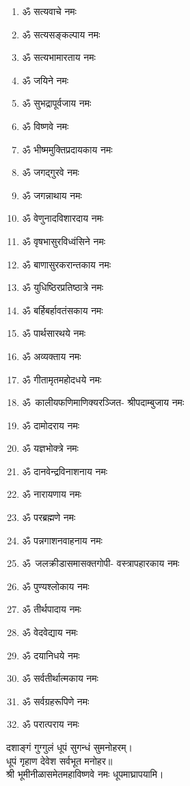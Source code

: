 \begin{multicols}{2}
\begin{enumerate}
\item ॐ सत्यवाचे नमः
\item ॐ सत्यसङ्कल्पाय नमः
\item ॐ सत्यभामारताय नमः
\item ॐ जयिने नमः
\item ॐ सुभद्रापूर्वजाय नमः
\item ॐ विष्णवे नमः
\item ॐ भीष्ममुक्तिप्रदायकाय नमः
\item ॐ जगद्गुरवे नमः
\item ॐ जगन्नाथाय नमः
\item ॐ वेणुनादविशारदाय नमः
\item ॐ वृषभासुरविध्वंसिने नमः
\item ॐ बाणासुरकरान्तकाय नमः
\item ॐ युधिष्ठिरप्रतिष्ठात्रे नमः
\item ॐ बर्हिबर्हावतंसकाय नमः
\item ॐ पार्थसारथये नमः
\item ॐ अव्यक्ताय नमः
\item ॐ गीतामृतमहोदधये नमः
\item \mbox{ॐ~कालीयफणिमाणिक्यरञ्जित-} श्रीपदाम्बुजाय नमः
\item ॐ दामोदराय नमः
\item ॐ यज्ञभोक्त्रे नमः
\item ॐ दानवेन्द्रविनाशनाय नमः
\item ॐ नारायणाय नमः
\item ॐ परब्रह्मणे नमः
\item ॐ पन्नगाशनवाहनाय नमः
\item \mbox{ॐ जलक्रीडासमासक्तगोपी-} वस्त्रापहारकाय नमः
\item ॐ पुण्यश्लोकाय नमः
\item ॐ तीर्थपादाय  नमः
\item ॐ वेदवेद्याय नमः
\item ॐ दयानिधये नमः
\item ॐ सर्वतीर्थात्मकाय नमः
\item ॐ सर्वग्रहरूपिणे नमः
\item ॐ परात्पराय नमः
\end{enumerate}
\end{multicols}
  
दशाङ्गं गुग्गुलं धूपं सुगन्धं सुमनोहरम्।\\
धूपं गृहाण देवेश सर्वभूत मनोहर॥ \\
श्री भूमीनीळासमेतमहाविष्णवे नमः धूपमाघ्रापयामि।\\
 
